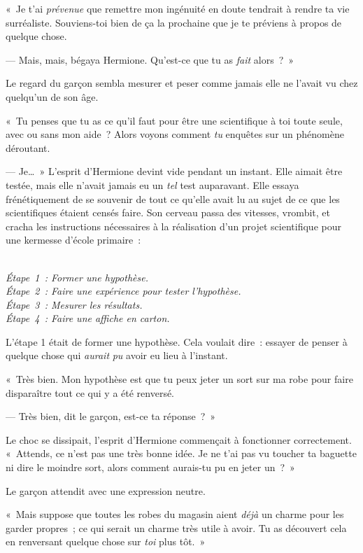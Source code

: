 «~Je t'ai \emph{prévenue} que remettre mon ingénuité en doute tendrait à rendre ta vie surréaliste. Souviens-toi bien de ça la prochaine que je te préviens à propos de quelque chose.

--- Mais, mais, bégaya Hermione. Qu'est-ce que tu as \emph{fait} alors~?~»

Le regard du garçon sembla mesurer et peser comme jamais elle ne l'avait vu chez quelqu'un de son âge.

«~Tu penses que tu as ce qu'il faut pour être une scientifique à toi toute seule, avec ou sans mon aide~? Alors voyons comment \emph{tu} enquêtes sur un phénomène déroutant.

--- Je…~» L'esprit d'Hermione devint vide pendant un instant. Elle aimait être testée, mais elle n'avait jamais eu un \emph{tel} test auparavant. Elle essaya frénétiquement de se souvenir de tout ce qu'elle avait lu au sujet de ce que les scientifiques étaient censés faire. Son cerveau passa des vitesses, vrombit, et cracha les instructions nécessaires à la réalisation d'un projet scientifique pour une kermesse d'école primaire~:

\emph{\\ 
Étape~1~: Former une hypothèse.\\
Étape~2~: Faire une expérience pour tester l'hypothèse.\\
Étape~3~: Mesurer les résultats.\\
Étape~4~: Faire une affiche en carton.\\
}

L'étape 1 était de former une hypothèse. Cela voulait dire~: essayer de penser à quelque chose qui \emph{aurait} \emph{pu} avoir eu lieu à l'instant.

«~Très bien. Mon hypothèse est que tu peux jeter un sort sur ma robe pour faire disparaître tout ce qui y a été renversé.

--- Très bien, dit le garçon, est-ce ta réponse~?~»

Le choc se dissipait, l'esprit d'Hermione commençait à fonctionner correctement. «~Attends, ce n'est pas une très bonne idée. Je ne t'ai pas vu toucher ta baguette ni dire le moindre sort, alors comment aurais-tu pu en jeter un~?~»

Le garçon attendit avec une expression neutre.

«~Mais suppose que toutes les robes du magasin aient \emph{déjà} un charme pour les garder propres~; ce qui serait un charme très utile à avoir. Tu as découvert cela en renversant quelque chose sur \emph{toi} plus tôt.~»

